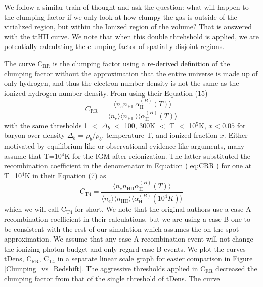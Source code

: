 \documentclass[letterpaper,10pt]{article}
\renewcommand{\(}{\left(}
\renewcommand{\)}{\right)}
\begin{document}
We follow a similar train of thought and ask the question:  what will
happen to the clumping factor if we only look at how clumpy the gas is
outside of the virialized region, but within the
Ionized region of the volume?  That is answered with the ttH{\footnotesize II} 
curve.  We note that when this double threhshold is
applied, we are potentially calculating the clumping factor of spatially disjoint
regions.  

The curve C$_\mathrm{RR}$ is the clumping factor using a re-derived
definition of the clumping factor without the approximation that the entire universe is made up
of only hydrogen, and thus the electron number density is not the same as the
ionized hydrogen number density.  
From \cite{ShullEtAl2012} using their Equation (15)
\begin{equation}
\label{eq:CRR}
  C_\mathrm{RR} = \frac{\langle n_e n_\mathrm{HII} \alpha_\mathrm{H}^{(B)}(T) \rangle}
  {\langle {n_e}\rangle\langle n_\mathrm{HII} \rangle \langle\alpha_\mathrm{H}^{(B)}(T)\rangle}
\end{equation}
with the same thresholds 1 $<$ $\Delta_b$ $<$ 100, 
300K $<$ T $<$ 10$^5$K, $x < 0.05$ for baryon over density $\Delta_b$ = 
$\rho_b$/$\bar{\rho_b}$, temperature T, and ionized fraction $x$.  Either motivated by 
equilibrium like \cite{HuiGnedin1997} or observational evidence like \cite{FinlatorEtAl2012}
arguments, many assume that T=10$^4$K for the IGM after reionization.
The latter substituted the recombination coefficient in the denomenator
in Equation (\ref{eq:CRR}) for one at T=10$^4$K in their Equation (7) as
\begin{equation}
\label{eq:CT4}
  C_\mathrm{T4} = \frac{\langle n_e n_\mathrm{HII} \alpha_\mathrm{H}^{(B)}(T) \rangle}
  {\langle n_e\rangle \langle n_\mathrm{HII}\rangle \langle\alpha_\mathrm{H}^{(B)}(10^4K)\rangle}
\end{equation}
which we will call C$_\mathrm{T4}$ for short.  We note that the original authors use a case A recombination coefficient in their calculations, but we are using a case B one to be consistent with the rest of our simulation which assumes the on-the-spot approximation.  We assume that any case A recombination event will not change the ionizing photon budget and only regard case B events.
We plot the curves tDens, C$_\mathrm{RR}$, 
C$_\mathrm{T4}$ in a separate linear scale graph for easier comparison
in Figure \ref{Clumping_vs_Redshift}. The aggressive thresholds applied in C$_\mathrm{RR}$
decreased the clumping factor from that of the single threshold of tDens.  The curve 
\end{document}
